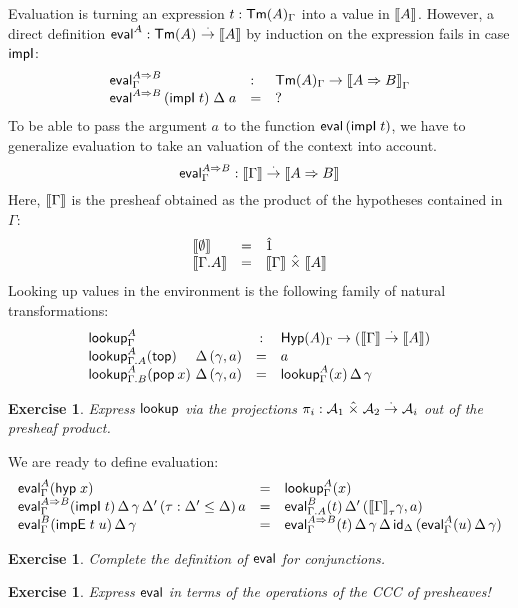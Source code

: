 \documentclass[a4paper]{article}
\newtheorem{exercise}[theorem]{Exercise}
\begin{document}
Evaluation is turning an expression $t : \TmG A$ into a value in
$\den A$.  However, a direct definition $\teval^A : \Tm A \todot \den A$
by induction on the expression fails in case $\timpI$:
\[
\begin{array}{lll}
   \teval^{A \imp B}_\Gamma & : & \TmG A \to \den {A \imp B} _\Gamma \\
   \teval^{A \imp B}\,(\impI t)\;\Delta\;a & = & ? \\
\end{array}
\]
To be able to pass the argument $a$ to the function $\teval\,(\impI
t)$, we have to generalize evaluation to take an valuation of the
context into account.
\[
  \teval^{A \imp B}_\Gamma  : \den \Gamma \todot \den {A \imp B}
\]
Here, $\den \Gamma$ is the presheaf obtained as the product of the
hypotheses contained in $\Gamma$:
\[
\begin{array}{lll}
  \den{\cempty} & = & \hatone \\
  \den{\Gamma.A} & = & \den\Gamma \hattimes \den A \\
\end{array}
\]
Looking up values in the environment is the following family of
natural transformations:
\[
\begin{array}{l@{~}lcl}
  \multicolumn 2 l {\tlookup^A_\Gamma} & : & \HypG A \to (\den \Gamma \todot \den A) \\
  \lookup[\Gamma.A]A \ttop    & \Delta\,(\gamma,a) & = & a \\
  \lookup[\Gamma.B]A {\pop x} &\Delta\,(\gamma,a) & = & \lookup[\Gamma]A x\, \Delta\, \gamma \\
\end{array}
\]
\begin{exercise}
  Express $\tlookup$ via the projections
  $\pi_i : \A_1 \hattimes \A_2 \todot \A_i$
  out of the presheaf product.
\end{exercise}
We are ready to define evaluation:
\[
\begin{array}{lcl}
  \evalG A {\hyp x} & = & \lookupG A x \\
  \evalG {A \imp B} {\impI t}\,\Delta\,\gamma\,\Delta'\,(\tau : \Delta' \leq \Delta)\,a
    & = & \eval[\Gamma.A]B t\,\Delta'\,(\den\Gamma_\tau\gamma,a) \\
  \evalG {B} {\impE t u}\,\Delta\,\gamma & = &
    \evalG {A \imp B} t\,\Delta\,\gamma\,\Delta\,\id[\Delta]\,
      (\evalG A u\,\Delta\,\gamma) \\
\end{array}
\]
\begin{exercise}
  Complete the definition of $\teval$ for conjunctions.
\end{exercise}
\begin{exercise}
  Express $\teval$ in terms of the operations of the CCC of
  presheaves!
\end{exercise}
\end{document}
